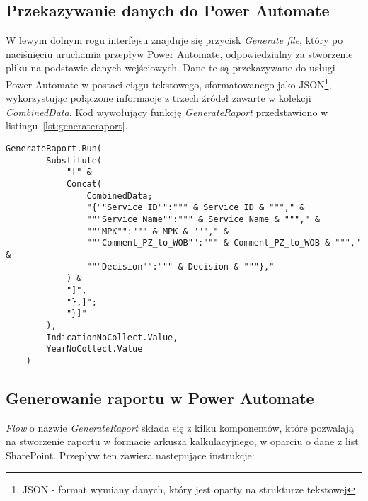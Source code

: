 \subsection{Przekazywanie danych do Power Automate}

W lewym dolnym rogu interfejsu znajduje się przycisk \emph{Generate file}, który po naciśnięciu uruchamia przepływ Power Automate, odpowiedzialny za stworzenie pliku na podstawie danych wejściowych. Dane te są przekazywane do usługi Power Automate w postaci ciągu tekstowego, sformatowanego jako JSON\footnote{JSON - format wymiany danych, który jest oparty na strukturze tekstowej}, wykorzystując połączone informacje z trzech źródeł zawarte w kolekcji \emph{CombinedData}. Kod wywołujący funkcję \emph{GenerateRaport} przedstawiono w listingu~\ref{lst:generateraport}.



\begin{lstlisting}[language=PowerFx, caption={Kod wywołujący funkcję GenerateRaport}, label={lst:generateraport}]
    GenerateRaport.Run(
        Substitute(
            "[" & 
            Concat(
                CombinedData;
                "{""Service_ID"":""" & Service_ID & """," &
                """Service_Name"":""" & Service_Name & """," &
                """MPK"":""" & MPK & """," &
                """Comment_PZ_to_WOB"":""" & Comment_PZ_to_WOB & """," &
                """Decision"":""" & Decision & """},"
            ) & 
            "]",
            "},]"; 
            "}]"
        ),
        IndicationNoCollect.Value,
        YearNoCollect.Value
    )
    \end{lstlisting}



\subsection{Generowanie raportu w Power Automate}


\emph{Flow} o nazwie \emph{GenerateRaport} składa się z kilku komponentów, które
pozwalają na stworzenie raportu w formacie arkusza kalkulacyjnego, w oparciu o dane z list SharePoint. Przepływ ten zawiera następujące instrukcje:

